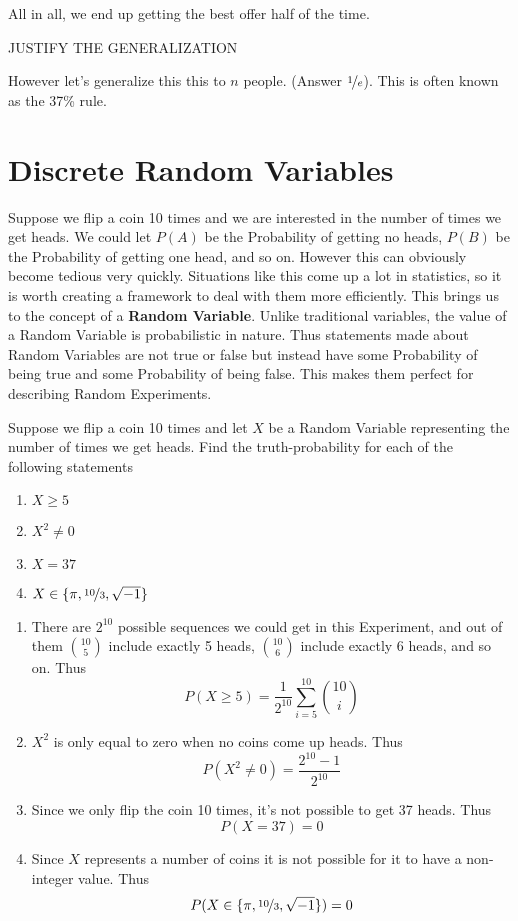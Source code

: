 \documentclass{report}
\begin{document}
\\\\

All in all, we end up getting the best offer half of the time.

\todo JUSTIFY THE GENERALIZATION

However let's generalize this this to $n$ people. (Answer $\nicefrac 1e$). This is often known as the 37\% rule. 


\section{Discrete Random Variables}
Suppose we flip a coin 10 times and we are interested in the number of times we get heads. We could let $P(A)$ be the Probability of getting no heads, $P(B)$ be the Probability of getting one head, and so on. However this can obviously become tedious very quickly. Situations like this come up a lot in statistics, so it is worth creating a framework to deal with them more efficiently. This brings us to the concept of a \textbf{Random Variable}. Unlike traditional variables, the value of a Random Variable is probabilistic in nature. Thus statements made about Random Variables are not true or false but instead have some Probability of being true and some Probability of being false. This makes them perfect for describing Random Experiments. 
\begin{example}
    Suppose we flip a coin 10 times and let $X$ be a Random Variable representing the number of times we get heads. Find the truth-probability for each of the following statements
    \begin{enumerate}
        \item $X\ge 5$
        \item $X^2\ne 0$ 
        \item $X=37$
        \item $X\in\{\pi, \nicefrac{10} 3, \sqrt {-1}\}$
    \end{enumerate}
    \solution
    \begin{enumerate}
        \item There are $2^{10}$ possible sequences we could get in this Experiment, and out of them $\binom {10} 5$ include exactly 5 heads, $\binom {10} 6$ include exactly 6 heads, and so on. Thus
        \[
            P(X\ge 5) = \frac 1 {2^{10}} \sum_{i=5}^{10} \binom {10} i
        \]
        \item $X^2$ is only equal to zero when no coins come up heads. Thus
        \[
            P(X^2\ne 0) = \frac{2^{10}-1}{2^{10}}
        \]
        \item Since we only flip the coin 10 times, it's not possible to get 37 heads. Thus
        \[
            P(X=37)=0
        \]
        \item Since $X$ represents a number of coins it is not possible for it to have a non-integer value. Thus
        \[
            P(X\in\{\pi, \nicefrac{10} 3, \sqrt {-1}\})=0
        \]
    \end{enumerate}
\end{example}
\end{document}
